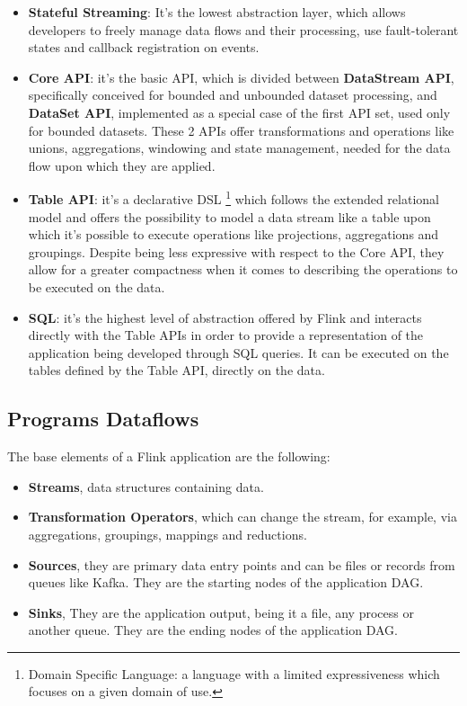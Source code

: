 \begin{itemize}
	\item \textbf{Stateful Streaming}: It's the lowest abstraction layer, which allows developers to freely manage data flows and their processing, use fault-tolerant states and callback registration on events.
	\item \textbf{Core API}: it's the basic API, which is divided between \textbf{DataStream API}, specifically conceived for bounded and unbounded dataset processing, and \textbf{DataSet API}, implemented as a special case of the first API set, used only for bounded datasets. These 2 APIs offer transformations and operations like unions, aggregations, windowing and state management, needed for the data flow upon which they are applied.
	\item \textbf{Table API}: it's a declarative DSL \footnote{Domain Specific Language: a language with a limited expressiveness which focuses on a given domain of use.} which follows the extended relational model and offers the possibility to model a data stream like a table upon which it's possible to execute operations like projections, aggregations and groupings. Despite being less expressive with respect to the Core API, they allow for a greater compactness when it comes to describing the operations to be executed on the data.
	\item \textbf{SQL}: it's the highest level of abstraction offered by Flink and interacts directly with the Table APIs in order to provide a representation of the application being developed through SQL queries. It can be executed on the tables defined by the Table API, directly on the data.
\end{itemize}

\subsection{Programs Dataflows}  \label{ProgramsDataflows}

The base elements of a Flink application are the following:

\begin{itemize}
	\item \textbf{Streams}, data structures containing data.
	\item \textbf{Transformation Operators}, which can change the stream, for example, via aggregations, groupings, mappings and reductions.
	\item \textbf{Sources}, they are primary data entry points and can be files or records from queues like Kafka. They are the starting nodes of the application DAG.
    \item \textbf{Sinks}, They are the application output, being it a file, any process or another queue. They are the ending nodes of the application DAG.
\end{itemize}


